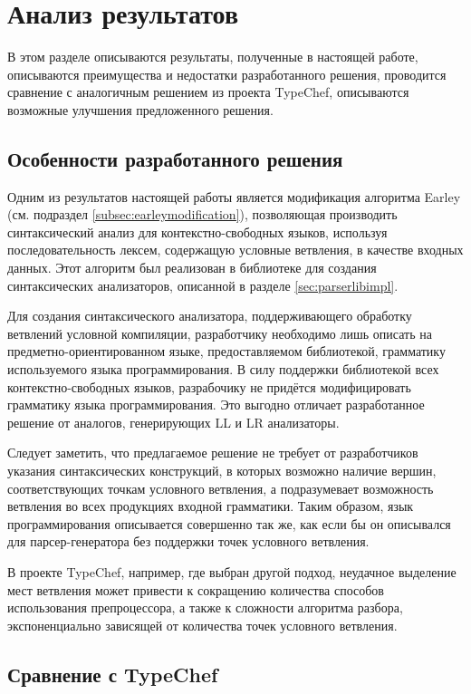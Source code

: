 \clearpage


\section{Анализ результатов}

В этом разделе описываются результаты, полученные в настоящей работе, описываются преимущества и недостатки разработанного решения, проводится сравнение с аналогичным решением из проекта TypeChef, описываются возможные улучшения предложенного решения.

\subsection{Особенности разработанного решения}

Одним из результатов настоящей работы является модификация алгоритма Earley (см. подраздел \ref{subsec:earleymodification}), позволяющая производить синтаксический анализ для контекстно-свободных языков, используя последовательность лексем, содержащую условные ветвления, в качестве входных данных. Этот алгоритм был реализован в библиотеке для создания синтаксических анализаторов, описанной в разделе \ref{sec:parserlibimpl}. 

Для создания синтаксического анализатора, поддерживающего обработку ветвлений условной компиляции, разработчику необходимо лишь описать на предметно-ориентированном языке, предоставляемом библиотекой, грамматику используемого языка программирования. В силу поддержки библиотекой всех контекстно-свободных языков, разрабочику не придётся модифицировать грамматику языка программирования. Это выгодно отличает разработанное решение от аналогов, генерирующих LL и LR анализаторы. 

Следует заметить, что предлагаемое решение не требует от разработчиков указания синтаксических конструкций, в которых возможно наличие вершин, соответствующих точкам условного ветвления, а подразумевает возможность ветвления во всех продукциях входной грамматики. Таким образом, язык программирования описывается совершенно так же, как если бы он описывался для парсер-генератора без поддержки точек условного ветвления. 

В проекте TypeChef, например, где выбран другой подход, неудачное выделение мест ветвления может привести к сокращению количества способов использования препроцессора, а также к сложности алгоритма разбора, экспоненциально зависящей от количества точек условного ветвления.

\subsection{Сравнение с TypeChef}

